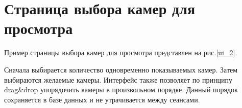 \newpage

\begin{figure}[!htb]
\def\svgwidth{\columnwidth}
\caption{}
\label{ui_4}
\end{figure}

\begin{figure}[!htb]
\def\svgwidth{\columnwidth}
\caption{}
\label{ui_5}
\end{figure}

\newpage

\section{Страница выбора камер для просмотра}
Пример страницы выбора камер для просмотра представлен на рис.\ref{ui_2}.

Сначала выбирается количество одновременно показываемых камер.
Затем выбираются желаемые камеры.
Интерфейс также позволяет по принципу drag\&drop упорядочить камеры в
произвольном порядке. Данный порядок сохраняется в базе данных и не
утрачивается между сеансами.

